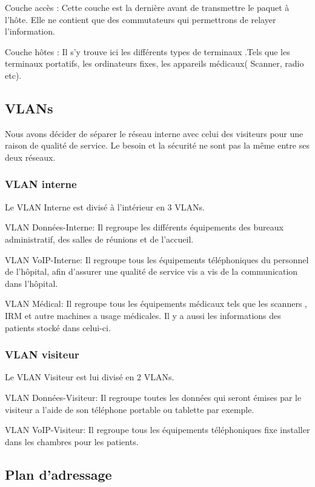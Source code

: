 Couche accès :
Cette couche est la dernière avant de transmettre le paquet à l'hôte.
Elle ne contient que des commutateurs qui permettrons de relayer l'information.

Couche hôtes :
Il s'y trouve ici les différents types de terminaux .Tels que les terminaux portatifs, les ordinateurs fixes, les appareils médicaux( Scanner, radio etc).

%
    \cleardoublepage
%
%
\subsection{VLANs}

Nous avons décider de séparer le réseau interne avec celui des visiteurs pour une raison de qualité de service.
Le besoin et la sécurité ne sont pas la même entre ses deux réseaux.

%
%
\subsubsection{VLAN interne}

Le VLAN Interne est divisé à l'intérieur en 3 VLANs.

VLAN Données-Interne:
Il regroupe les différents équipements des bureaux administratif, des salles de réunions et de l'accueil.

VLAN VoIP-Interne:
Il regroupe tous les équipements téléphoniques du personnel de l'hôpital, afin d'assurer une qualité de service vis a vis de la communication dans l'hôpital.

VLAN Médical:
Il regroupe tous les équipements médicaux tels que les scanners , IRM et autre machines a usage médicales.
Il y a aussi les informations des patients stocké dans celui-ci.

%
%
\subsubsection{VLAN visiteur}

Le VLAN Visiteur est lui divisé en 2 VLANs.

VLAN Données-Visiteur:
Il regroupe toutes les données qui seront émises par le visiteur a l'aide de son téléphone portable ou tablette par exemple.

VLAN VoIP-Visiteur:
Il regroupe  tous les équipements téléphoniques fixe installer dans les chambres pour les patients.



%
%
\subsection{Plan d'adressage}

